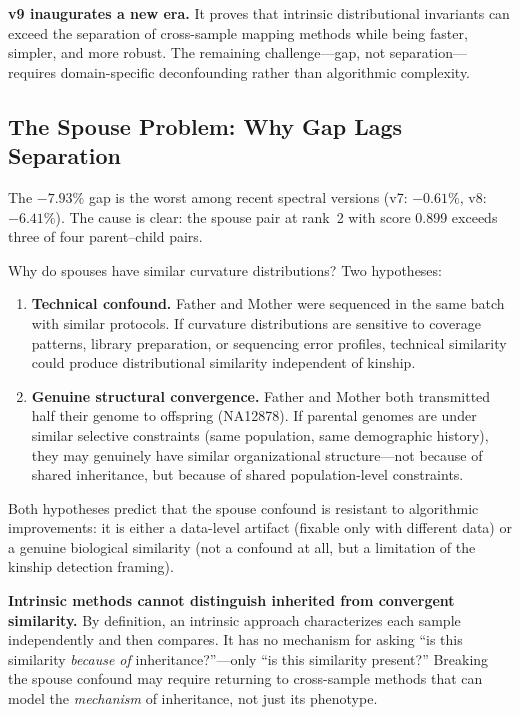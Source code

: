 \documentclass{../yalumba}
\begin{document}
\begin{keyfinding}
\textbf{v9 inaugurates a new era.}  It proves that intrinsic distributional
invariants can exceed the separation of cross-sample mapping methods while
being faster, simpler, and more robust.  The remaining challenge---gap,
not separation---requires domain-specific deconfounding rather than
algorithmic complexity.
\end{keyfinding}

\subsection{The Spouse Problem: Why Gap Lags Separation}

The $-7.93\%$ gap is the worst among recent spectral versions (v7: $-0.61\%$,
v8: $-6.41\%$).  The cause is clear: the spouse pair at rank~2 with score
0.899 exceeds three of four parent--child pairs.

Why do spouses have similar curvature distributions?  Two hypotheses:

\begin{enumerate}
  \item \textbf{Technical confound.}  Father and Mother were sequenced in
    the same batch with similar protocols.  If curvature distributions are
    sensitive to coverage patterns, library preparation, or sequencing
    error profiles, technical similarity could produce distributional
    similarity independent of kinship.

  \item \textbf{Genuine structural convergence.}  Father and Mother both
    transmitted half their genome to offspring (NA12878).  If parental
    genomes are under similar selective constraints (same population, same
    demographic history), they may genuinely have similar organizational
    structure---not because of shared inheritance, but because of shared
    population-level constraints.
\end{enumerate}

Both hypotheses predict that the spouse confound is resistant to algorithmic
improvements: it is either a data-level artifact (fixable only with
different data) or a genuine biological similarity (not a confound at all,
but a limitation of the kinship detection framing).

\begin{limitation}
\textbf{Intrinsic methods cannot distinguish inherited from convergent
similarity.}  By definition, an intrinsic approach characterizes each
sample independently and then compares.  It has no mechanism for asking
``is this similarity \emph{because of} inheritance?''---only ``is this
similarity present?''  Breaking the spouse confound may require returning
to cross-sample methods that can model the \emph{mechanism} of inheritance,
not just its phenotype.
\end{limitation}
\end{document}
